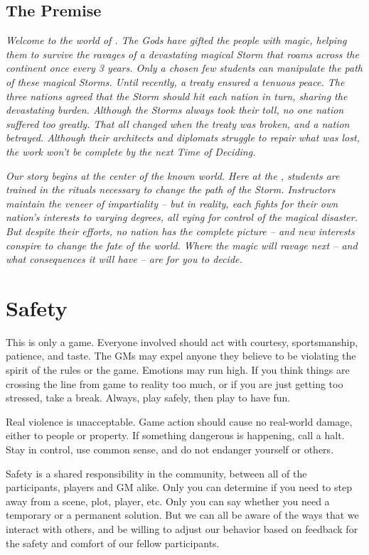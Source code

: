 \documentclass[sheet]{GL2020}
\begin{document}
\subsection{The Premise}
\emph{Welcome to the world of \pEarth{}. The Gods have gifted the people with magic, helping them to survive the ravages of a devastating magical Storm that roams across the continent once every 3 years. Only a chosen few students can manipulate the path of these magical Storms. Until recently, a treaty ensured a tenuous peace. The three nations agreed that the Storm should hit each nation in turn, sharing the devastating burden. Although the Storms always took their toll, no one nation suffered too greatly. That all changed when the treaty was broken, and a nation betrayed. Although their architects and diplomats struggle to repair what was lost, the work won't be complete by the next Time of Deciding.}

\emph{Our story begins at the center of the known world. Here at the \pSchool{}, students are trained in the rituals necessary to change the path of the Storm. Instructors maintain the veneer of impartiality -- but in reality, each fights for their own nation's interests to varying degrees, all vying for control of the magical disaster. But despite their efforts, no nation has the complete picture -- and new interests conspire to change the fate of the world. Where the magic will ravage next -- and what consequences it will have -- are for you to decide.}


\section{Safety}
This is only a game.  Everyone involved should act with courtesy, sportsmanship, patience, and taste.  The GMs may expel anyone they believe to be violating the spirit of the rules or the game.  Emotions may run high. If you think things are crossing the line from game to reality too much, or if you are just getting too stressed, take a break. Always, play safely, then play to have fun. 

Real violence is unacceptable. Game action should cause no real-world damage, either to people or property. If something dangerous is happening, call a halt. Stay in control, use common sense, and do not endanger yourself or others.

Safety is a shared responsibility in the community, between all of the participants, players and GM alike. Only you can determine if you need to step away from a scene, plot, player, etc. Only you can say whether you need a temporary or a permanent solution. But we can all be aware of the ways that we interact with others, and be willing to adjust our behavior based on feedback for the safety and comfort of our fellow participants.
\end{document}
